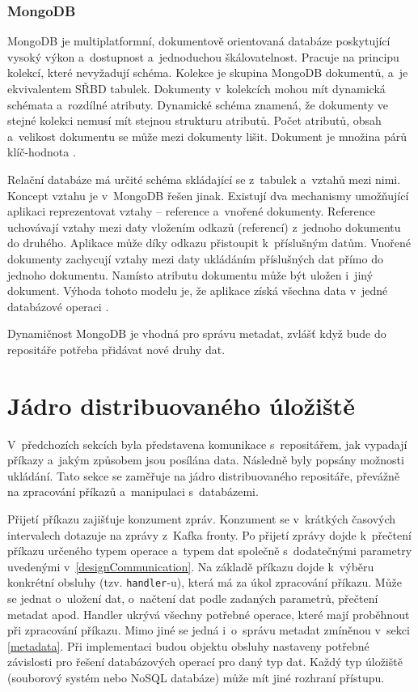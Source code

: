 \subsubsection{MongoDB}
MongoDB je multiplatformní, dokumentově orientovaná databáze poskytující vysoký výkon a~dostupnost a~jednoduchou škálovatelnost. Pracuje na principu kolekcí, které nevyžadují schéma. Kolekce je skupina MongoDB dokumentů, a~je ekvivalentem SŘBD tabulek. Dokumenty v~kolekcích mohou mít dynamická schémata a~rozdílné atributy. Dynamické schéma znamená, že dokumenty ve stejné kolekci nemusí mít stejnou strukturu atributů. Počet atributů, obsah a~velikost dokumentu se může mezi dokumenty lišit. Dokument je množina párů klíč-hodnota \cite{mongoDBTutorialsPoint}.

Relační databáze má určité schéma skládající se z~tabulek a~vztahů mezi nimi. Koncept vztahu je v~MongoDB  řešen jinak. Existují dva mechanismy umožňující aplikaci reprezentovat vztahy -- reference a~vnořené dokumenty. Reference uchovávají vztahy mezi daty vložením odkazů (referencí) z~jednoho dokumentu do druhého. Aplikace může díky odkazu přistoupit k~příslušným datům. Vnořené dokumenty zachycují vztahy mezi daty ukládáním příslušných dat přímo do jednoho dokumentu. Namísto atributu dokumentu může být uložen i~jiný dokument. Výhoda tohoto modelu je, že aplikace získá všechna data v~jedné databázové operaci \cite{mongoDBDataModelingIntro}.

Dynamičnost MongoDB je vhodná pro správu metadat, zvlášť když bude do repositáře potřeba přidávat nové druhy dat.

\section{Jádro distribuovaného úložiště}
V~předchozích sekcích byla představena komunikace s~repositářem, jak vypadají příkazy a~jakým způsobem jsou posílána data. Následně byly popsány možnosti ukládání. Tato sekce se zaměřuje na jádro distribuovaného repositáře, převážně na zpracování příkazů a~manipulaci s~databázemi.

Přijetí příkazu zajišťuje konzument zpráv. Konzument se v~krátkých časových intervalech dotazuje na zprávy z~Kafka fronty. Po přijetí zprávy dojde k~přečtení příkazu určeného typem operace a~typem dat společně s~dodatečnými parametry uvedenými v~\ref{designCommunication}. Na základě příkazu dojde k~výběru konkrétní obsluhy (tzv. \texttt{handler}-u), která má za úkol zpracování příkazu. Může se jednat o~uložení dat, o~načtení dat podle zadaných parametrů, přečtení metadat apod. Handler ukrývá všechny potřebné operace, které mají proběhnout při zpracování příkazu. Mimo jiné se jedná i~o~správu metadat zmíněnou v~sekci \ref{metadata}. Při implementaci budou objektu obsluhy nastaveny potřebné závislosti pro řešení databázových operací pro daný typ dat. Každý typ úložiště (souborový systém nebo NoSQL databáze) může mít jiné rozhraní přístupu.


